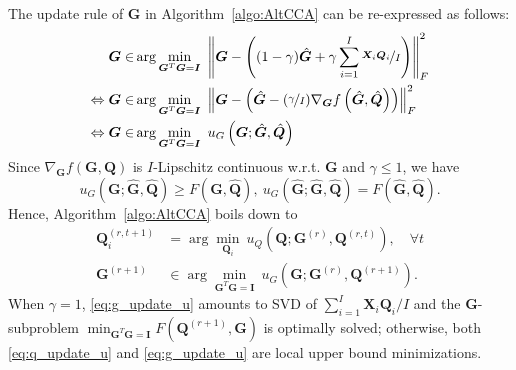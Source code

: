 \documentclass[10pt,journal]{IEEEtran}
\newcommand{\G}{\boldsymbol{G}}
\newcommand{\Q}{\boldsymbol{Q}}
\newcommand{\X}{\boldsymbol{X}}
\begin{document}
The update rule of $\G$ in Algorithm~\ref{algo:AltCCA} can be re-expressed as follows:
\begin{align*}
 \G \in & \arg\min_{\G^T\G={\bm I}}~\left\|\G - \left((1-\gamma)\hat{\G}+\gamma \sum_{i=1}^I\nicefrac{\X_i\Q_i}{I}\right)\right\|_F^2 \\
\Leftrightarrow  \G  \in & \arg\min_{\G^T\G={\bm I}}~\left\|\G - \left(\hat{\G}-(\nicefrac{\gamma}{I}) \nabla_{\G} f\left(\hat{\bm G},\hat{\bm Q}\right)\right)\right\|_F^2\\
\Leftrightarrow   \G  \in & \arg\min_{\G^T\G={\bm I}}~u_G\left(\G;\hat{\bm G},\hat{\bm Q}\right)
\end{align*}
Since $\nabla_{\G} f({\bm G},{\bm Q})$ is $I$-Lipschitz continuous w.r.t. $\G$ and $\gamma\leq 1$, we have
\begin{equation}\label{eq:ugleqf}
	u_G\left({\bm G};\hat{\bm G},\hat{\bm Q}\right)\geq F\left({\bm G},\hat{\bm Q}\right),~
	u_G\left(\hat{\bm G};\hat{\bm G},\hat{\bm Q}\right)= F\left(\hat{\bm G},\hat{\bm Q}\right).
\end{equation}
Hence, Algorithm~\ref{algo:AltCCA} boils down to
\begin{subequations}
\begin{align}
{\bm Q}_i^{(r,t+1)}&= \arg\min_{{\bm Q}_i}~u_{Q}\left( {\bm Q};{\bm G}^{(r)},{\bm Q}^{(r,t)} \right),\quad \forall t\label{eq:q_update_u}\\
\G^{(r+1)} &\in \arg\min_{\G^T\G={\bm I}}~u_G\left(\G;{\bm G}^{(r)},{\bm Q}^{(r+1)}\right). \label{eq:g_update_u}
\end{align}
\end{subequations}
When $\gamma=1$, \eqref{eq:g_update_u} amounts to SVD of $\sum_{i=1}^I\X_i\Q_i/I$ and the ${\bm G}$-subproblem $\min_{\G^T\G={\bm I}}F({\bm Q}^{(r+1)},\G)$ is optimally solved;
otherwise, both \eqref{eq:q_update_u} and \eqref{eq:g_update_u} are local upper bound minimizations.
\end{document}
